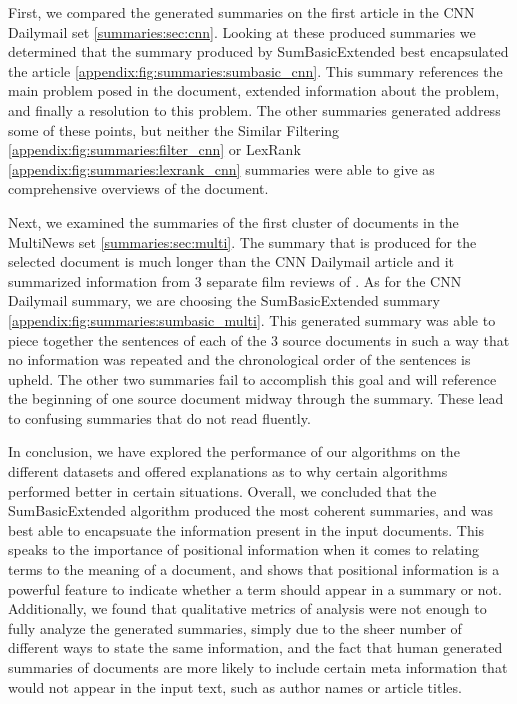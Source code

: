 \documentclass[../writeup.tex]{subfiles}
\begin{document}
First, we compared the generated summaries on the first article in the CNN Dailymail set \ref{summaries:sec:cnn}. Looking at these produced summaries
we determined that the summary produced by SumBasicExtended best encapsulated the article \ref{appendix:fig:summaries:sumbasic_cnn}. This summary references the
main problem posed in the document, extended information about the problem, and finally a resolution to this problem. The other summaries generated address some of
these points, but neither the Similar Filtering \ref{appendix:fig:summaries:filter_cnn} or LexRank \ref{appendix:fig:summaries:lexrank_cnn} summaries were able to
give as comprehensive overviews of the document.

Next, we examined the summaries of the first cluster of documents in the MultiNews set \ref{summaries:sec:multi}. The summary that is produced for the selected
document is much longer than the CNN Dailymail article and it summarized information from 3 separate film reviews of . As for the CNN Dailymail summary,
we are choosing the SumBasicExtended summary \ref{appendix:fig:summaries:sumbasic_multi}. This generated summary was able to piece together the sentences of each of the $3$ source documents
in such a way that no information was repeated and the chronological order of the sentences is upheld. The other two summaries fail to accomplish this goal and will reference the beginning of one
source document midway through the summary. These lead to confusing summaries that do not read fluently.

In conclusion, we have explored the performance of our algorithms on the different datasets and offered explanations as to why certain algorithms performed better in certain situations.
Overall, we concluded that the SumBasicExtended algorithm produced the most coherent summaries, and was best able to encapsuate the information present in the input documents.
This speaks to the importance of positional information when it comes to relating terms to the meaning of a document, and shows that positional information is a powerful feature to indicate whether a term should appear in a summary or not.
Additionally, we found that qualitative metrics of analysis were not enough to fully analyze the generated summaries, simply due to the sheer number of different ways to state the same information, and the fact that human generated summaries of documents
are more likely to include certain meta information that would not appear in the input text, such as author names or article titles.
\end{document}
